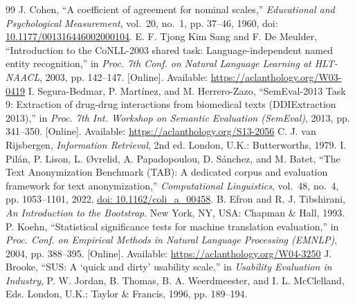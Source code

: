 \documentclass[12pt,a4paper]{article}
\newcommand{\doi}[1]{doi: \href{https://doi.org/#1}{#1}}
\begin{document}
\begin{thebibliography}{99}
 J. Cohen, ``A coefficient of agreement for nominal scales,'' \emph{Educational and Psychological Measurement}, vol.~20, no.~1, pp. 37--46, 1960, \doi{10.1177/001316446002000104}.
 E. F. Tjong Kim Sang and F. De Meulder, ``Introduction to the CoNLL-2003 shared task: Language-independent named entity recognition,'' in \emph{Proc. 7th Conf. on Natural Language Learning at HLT-NAACL}, 2003, pp. 142--147. [Online]. Available: \url{https://aclanthology.org/W03-0419}
 I. Segura-Bedmar, P. Mart\'inez, and M. Herrero-Zazo, ``SemEval-2013 Task 9: Extraction of drug-drug interactions from biomedical texts (DDIExtraction 2013),'' in \emph{Proc. 7th Int. Workshop on Semantic Evaluation (SemEval)}, 2013, pp. 341--350. [Online]. Available: \url{https://aclanthology.org/S13-2056}
 C. J. van Rijsbergen, \emph{Information Retrieval}, 2nd ed. London, U.K.: Butterworths, 1979.
 I. Pil\'an, P. Lison, L. {\O}vrelid, A. Papadopoulou, D. S\'anchez, and M. Batet, ``The Text Anonymization Benchmark (TAB): A dedicated corpus and evaluation framework for text anonymization,'' \emph{Computational Linguistics}, vol.~48, no.~4, pp. 1053--1101, 2022, \href{https://doi.org/10.1162/coli_a_00458}{doi: 10.1162/coli\_a\_00458}.
 B. Efron and R. J. Tibshirani, \emph{An Introduction to the Bootstrap}. New York, NY, USA: Chapman \& Hall, 1993.
 P. Koehn, ``Statistical significance tests for machine translation evaluation,'' in \emph{Proc. Conf. on Empirical Methods in Natural Language Processing (EMNLP)}, 2004, pp. 388--395. [Online]. Available: \url{https://aclanthology.org/W04-3250}
 J. Brooke, ``SUS: A `quick and dirty' usability scale,'' in \emph{Usability Evaluation in Industry}, P. W. Jordan, B. Thomas, B. A. Weerdmeester, and I. L. McClelland, Eds. London, U.K.: Taylor \& Francis, 1996, pp. 189--194.
\end{thebibliography}
\end{document}
